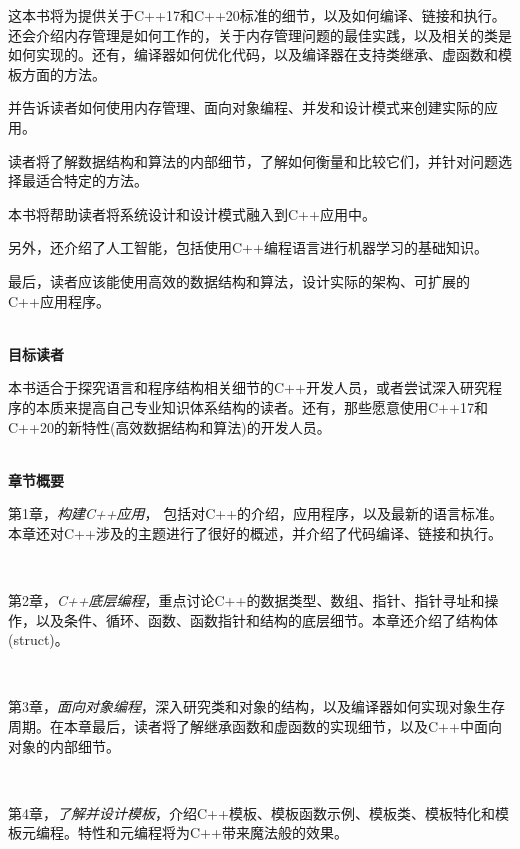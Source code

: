 
这本书将为提供关于C++17和C++20标准的细节，以及如何编译、链接和执行。还会介绍内存管理是如何工作的，关于内存管理问题的最佳实践，以及相关的类是如何实现的。还有，编译器如何优化代码，以及编译器在支持类继承、虚函数和模板方面的方法。 \par
并告诉读者如何使用内存管理、面向对象编程、并发和设计模式来创建实际的应用。 \par
读者将了解数据结构和算法的内部细节，了解如何衡量和比较它们，并针对问题选择最适合特定的方法。\par
本书将帮助读者将系统设计和设计模式融入到C++应用中。 \par
另外，还介绍了人工智能，包括使用C++编程语言进行机器学习的基础知识。 \par
最后，读者应该能使用高效的数据结构和算法，设计实际的架构、可扩展的C++应用程序。 \par

\hspace*{\fill} \\ %
\noindent\textbf{目标读者}\ \par
本书适合于探究语言和程序结构相关细节的C++开发人员，或者尝试深入研究程序的本质来提高自己专业知识体系结构的读者。还有，那些愿意使用C++17和C++20的新特性(高效数据结构和算法)的开发人员。 \par

\hspace*{\fill} \\ %
\noindent\textbf{章节概要}\ \par
\textsf{第1章}，\textit{构建C++应用}，
包括对C++的介绍，应用程序，以及最新的语言标准。本章还对C++涉及的主题进行了很好的概述，并介绍了代码编译、链接和执行。

\noindent\textbf{}\ \par
\textsf{第2章}，\textit{C++底层编程}，重点讨论C++的数据类型、数组、指针、指针寻址和操作，以及条件、循环、函数、函数指针和结构的底层细节。本章还介绍了结构体(struct)。

\noindent\textbf{}\ \par
\textsf{第3章}，\textit{面向对象编程}，深入研究类和对象的结构，以及编译器如何实现对象生存周期。在本章最后，读者将了解继承函数和虚函数的实现细节，以及C++中面向对象的内部细节。

\noindent\textbf{}\ \par
\textsf{第4章}，\textit{了解并设计模板}，介绍C++模板、模板函数示例、模板类、模板特化和模板元编程。特性和元编程将为C++带来魔法般的效果。

